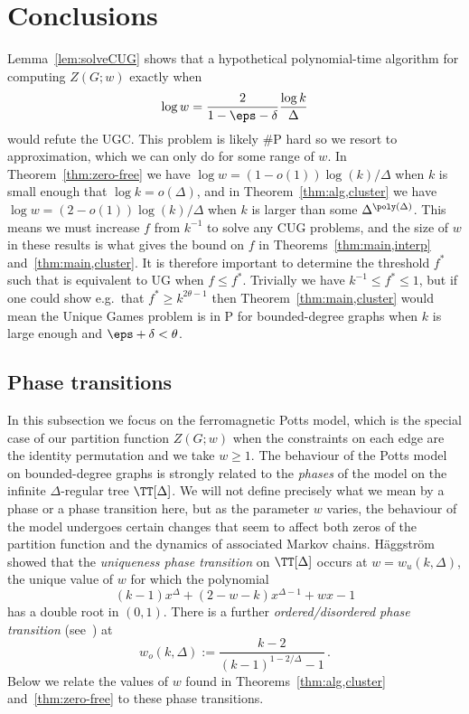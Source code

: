 \section{Conclusions}\label{sec:conc}
%
Lemma~\ref{lem:solveCUG} shows that a hypothetical polynomial-time algorithm for computing $Z(G;w)$ exactly when 
\[
\log w = \frac{2}{1-\eps-\delta}\frac{\log k}{\Delta}
\]
would refute the UGC. 
This problem is likely \#P hard so we resort to approximation, which we can only do for some range of $w$.
In Theorem~\ref{thm:zero-free} we have $\log w = (1-o(1))\log(k)/\Delta$ when $k$ is small enough that $\log k=o(\Delta)$, and in Theorem~\ref{thm:alg,cluster} we have $\log w = (2-o(1))\log(k)/\Delta$ when $k$ is larger than some $\Delta^{\poly(\Delta)}$. 
This means we must increase $f$ from $k^{-1}$ to solve any CUG problems, and the size of $w$ in these results is what gives the bound on $f$ in Theorems~\ref{thm:main,interp} and~\ref{thm:main,cluster}.
It is therefore important to determine the threshold $f^*$ such that \CUG[f] is equivalent to UG when $f\le f^*$. 
Trivially we have $k^{-1}\le f^*\le 1$, but if one could show e.g.\ that $f^*\ge k^{2\theta-1}$ then Theorem~\ref{thm:main,cluster} would mean the Unique Games problem is in P for bounded-degree graphs when $k$ is large enough and $\eps+\delta < \theta$.
%
%
\subsection{Phase transitions}
%
In this subsection we focus on the ferromagnetic Potts model, which is the special case of our partition function $Z(G;w)$ when the constraints on each edge are the identity permutation and we take $w\ge 1$.
The behaviour of the Potts model on bounded-degree graphs is strongly related to the \emph{phases} of the model on the infinite $\Delta$-regular tree $\TT[\Delta]$. 
We will not define precisely what we mean by a phase or a phase transition here, but as the parameter $w$ varies, the behaviour of the model undergoes certain changes that seem to affect both zeros of the partition function and the dynamics of associated Markov chains.
Häggström~\cite{Haggstrom96} showed that the \emph{uniqueness phase transition} on $\TT[\Delta]$ occurs at $w=w_u(k,\Delta)$, the unique value of $w$ for which the polynomial 
\begin{equation}\label{eq:def,wu}
(k-1)x^\Delta + (2-w-k)x^{\Delta-1}+wx-1
\end{equation}
has a double root in $(0,1)$. 
There is a further \emph{ordered/disordered phase transition} (see~\cite{GSVY16}) at 
\[
w_o(k,\Delta):=\frac{k-2}{(k-1)^{1-2/\Delta}-1}\,.
\]
Below we relate the values of $w$ found in Theorems~\ref{thm:alg,cluster} and~\ref{thm:zero-free} to these phase transitions.
%
